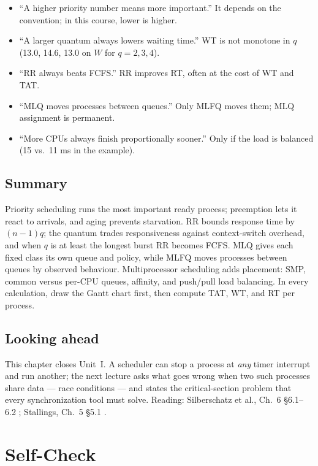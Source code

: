 \documentclass[11pt]{article}
\begin{document}
\begin{itemize}
  \item ``A higher priority number means more important.'' It depends on the convention; in this course, lower is higher.
  \item ``A larger quantum always lowers waiting time.'' WT is not monotone in $q$ (13.0, 14.6, 13.0 on $W$ for $q=2,3,4$).
  \item ``RR always beats FCFS.'' RR improves RT, often at the cost of WT and TAT.
  \item ``MLQ moves processes between queues.'' Only MLFQ moves them; MLQ assignment is permanent.
  \item ``More CPUs always finish proportionally sooner.'' Only if the load is balanced (15 vs.\ 11 ms in the example).
\end{itemize}

\subsection*{Summary}

Priority scheduling runs the most important ready process; preemption lets it react to arrivals, and aging prevents starvation. RR bounds response time by $(n-1)q$; the quantum trades responsiveness against context-switch overhead, and when $q$ is at least the longest burst RR becomes FCFS. MLQ gives each fixed class its own queue and policy, while MLFQ moves processes between queues by observed behaviour. Multiprocessor scheduling adds placement: SMP, common versus per-CPU queues, affinity, and push/pull load balancing. In every calculation, draw the Gantt chart first, then compute TAT, WT, and RT per process.

\subsection*{Looking ahead}

This chapter closes Unit~I. A scheduler can stop a process at \emph{any} timer interrupt and run another; the next lecture asks what goes wrong when two such processes share data --- race conditions --- and states the critical-section problem that every synchronization tool must solve. Reading: Silberschatz et al., Ch.~6 \S6.1--6.2 \cite{SilberschatzOSC_operating_system_concepts}; Stallings, Ch.~5 \S5.1 \cite{StallingsOS_internals_design_principles}.

\section*{Self-Check}
\end{document}
